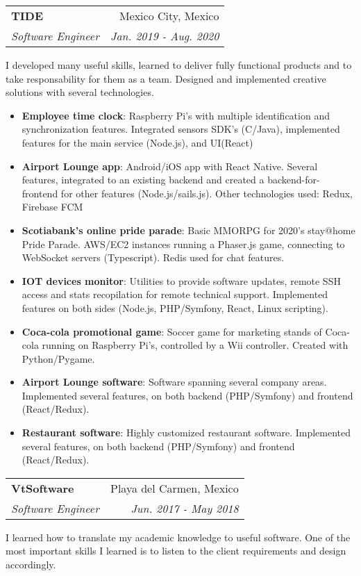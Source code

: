 \documentclass[letterpaper,11pt]{article}
\makeatletter
\newcommand{\resumeItem}[2]{
  \item\small{
    \textbf{#1}{: #2 \vspace{-2pt}}
  }
}
\newcommand{\resumeSubheading}[4]{
  \vspace{-1pt}\item
    \begin{tabular*}{0.97\textwidth}{l@{\extracolsep{\fill}}r}
      \textbf{#1} & #2 \\
      \textit{\small#3} & \textit{\small #4} \\
    \end{tabular*}\vspace{-5pt}
}
\newcommand{\resumeItemListStart}{\begin{itemize}}
\newcommand{\resumeItemListEnd}{\end{itemize}\vspace{-5pt}}
\makeatother
\begin{document}
    \resumeSubheading
      {TIDE}{Mexico City, Mexico}
      {Software Engineer}{Jan. 2019 - Aug. 2020}
      \vspace{3pt}

      I developed many useful skills, learned to deliver fully functional
      products and to take responsability for them as a team. Designed and implemented
      creative solutions with several technologies.
      \resumeItemListStart
        \resumeItem{Employee time clock}
          {Raspberry Pi's with multiple identification and synchronization features. Integrated
            sensors SDK's (C/Java), implemented features for the main service
            (Node.js), and UI(React)}
        \resumeItem{Airport Lounge app}
          {Android/iOS app with React Native. Several features, integrated to an
          existing backend and created a backend-for-frontend for other features
          (Node.js/sails.js). Other technologies used: Redux, Firebase FCM}
        \resumeItem{Scotiabank's online pride parade}
        {Basic MMORPG for 2020's stay@home Pride Parade. AWS/EC2 instances
          running a Phaser.js game, connecting to WebSocket servers (Typescript). Redis 
          used for chat features.}
        \resumeItem{IOT devices monitor}
          {Utilities to provide software updates, remote SSH access and stats
            recopilation for remote technical support. Implemented features on
            both sides (Node.js, PHP/Symfony, React, Linux scripting).}
        \resumeItem{Coca-cola promotional game}
          {Soccer game for marketing stands of Coca-cola running on Raspberry Pi's,
            controlled by a Wii controller. Created with Python/Pygame.}
        \resumeItem{Airport Lounge software}
          {Software spanning several company areas. Implemented several
            features, on both backend (PHP/Symfony) and frontend (React/Redux).}
        \resumeItem{Restaurant software}
          {Highly customized restaurant software. Implemented several features,
            on both backend (PHP/Symfony) and frontend (React/Redux).}
      \resumeItemListEnd

    \resumeSubheading
      {VtSoftware}{Playa del Carmen, Mexico}
      {Software Engineer}{Jun. 2017 - May 2018}
      \vspace{3pt}

      I learned how to translate my academic knowledge to useful software. One
      of the most important skills I learned is to listen to the client
      requirements and design accordingly.
\end{document}
